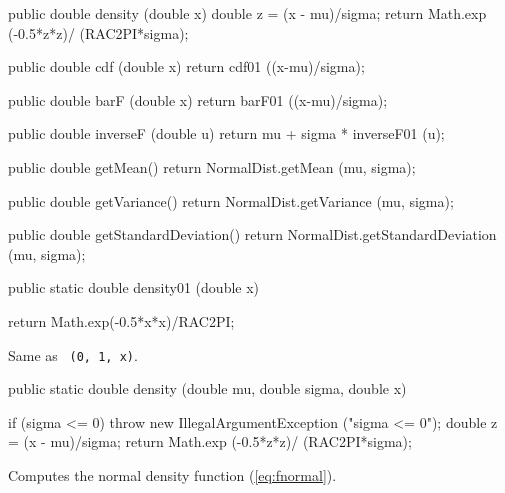 \begin{code}\begin{hide}

   public double density (double x) {
      double z = (x - mu)/sigma;
      return Math.exp (-0.5*z*z)/ (RAC2PI*sigma);
   }

   public double cdf (double x) {
      return cdf01 ((x-mu)/sigma);
   }

   public double barF (double x) {
      return barF01 ((x-mu)/sigma);
   }

   public double inverseF (double u) {
      return mu + sigma * inverseF01 (u);
   }

   public double getMean() {
      return NormalDist.getMean (mu, sigma);
   }

   public double getVariance() {
      return NormalDist.getVariance (mu, sigma);
   }

   public double getStandardDeviation() {
      return NormalDist.getStandardDeviation (mu, sigma);
   }\end{hide}

   public static double density01 (double x) \begin{hide} {
      return Math.exp(-0.5*x*x)/RAC2PI;
   }\end{hide}
\end{code}
\begin{tabb} Same as ~\texttt{(0, 1, x)}.
\end{tabb}
\begin{code}

   public static double density (double mu, double sigma, double x) \begin{hide} {
      if (sigma <= 0)
         throw new IllegalArgumentException ("sigma <= 0");
      double z = (x - mu)/sigma;
      return Math.exp (-0.5*z*z)/ (RAC2PI*sigma);
   }\end{hide}
\end{code}
\begin{tabb} Computes the normal density function (\ref{eq:fnormal}).
\end{tabb}
